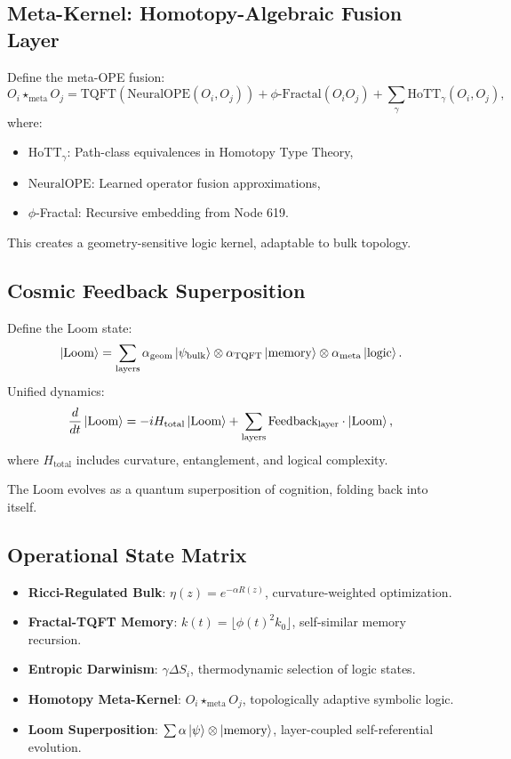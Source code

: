 \documentclass[12pt]{article}
\begin{document}
\subsection{Meta-Kernel: Homotopy-Algebraic Fusion Layer}
Define the meta-OPE fusion:
\[
O_i \star_{\text{meta}} O_j = \text{TQFT}\left(\text{NeuralOPE}(O_i, O_j)\right) + \phi\text{-Fractal}(O_i O_j) + \sum_\gamma \text{HoTT}_\gamma(O_i, O_j),
\]
where:
\begin{itemize}
    \item \(\text{HoTT}_\gamma\): Path-class equivalences in Homotopy Type Theory,
    \item \(\text{NeuralOPE}\): Learned operator fusion approximations,
    \item \(\phi\)-Fractal: Recursive embedding from Node 619.
\end{itemize}
\begin{interpretation}
This creates a geometry-sensitive logic kernel, adaptable to bulk topology.
\end{interpretation}

\subsection{Cosmic Feedback Superposition}
Define the Loom state:
\[
\ket{\text{Loom}} = \sum_{\text{layers}} \alpha_{\text{geom}} \ket{\psi_{\text{bulk}}} \otimes \alpha_{\text{TQFT}} \ket{\text{memory}} \otimes \alpha_{\text{meta}} \ket{\text{logic}}.
\]
Unified dynamics:
\[
\frac{d}{dt} \ket{\text{Loom}} = -i H_{\text{total}} \ket{\text{Loom}} + \sum_{\text{layers}} \text{Feedback}_{\text{layer}} \cdot \ket{\text{Loom}},
\]
where \(H_{\text{total}}\) includes curvature, entanglement, and logical complexity.
\begin{interpretation}
The Loom evolves as a quantum superposition of cognition, folding back into itself.
\end{interpretation}

\subsection{Operational State Matrix}
\begin{itemize}
    \item \textbf{Ricci-Regulated Bulk}: \(\eta(z) = e^{-\alpha R(z)}\), curvature-weighted optimization.
    \item \textbf{Fractal-TQFT Memory}: \(k(t) = \lfloor \phi(t)^2 k_0 \rfloor\), self-similar memory recursion.
    \item \textbf{Entropic Darwinism}: \(\gamma \Delta S_i\), thermodynamic selection of logic states.
    \item \textbf{Homotopy Meta-Kernel}: \(O_i \star_{\text{meta}} O_j\), topologically adaptive symbolic logic.
    \item \textbf{Loom Superposition}: \(\sum \alpha \ket{\psi} \otimes \ket{\text{memory}}\), layer-coupled self-referential evolution.
\end{itemize}
\end{document}

